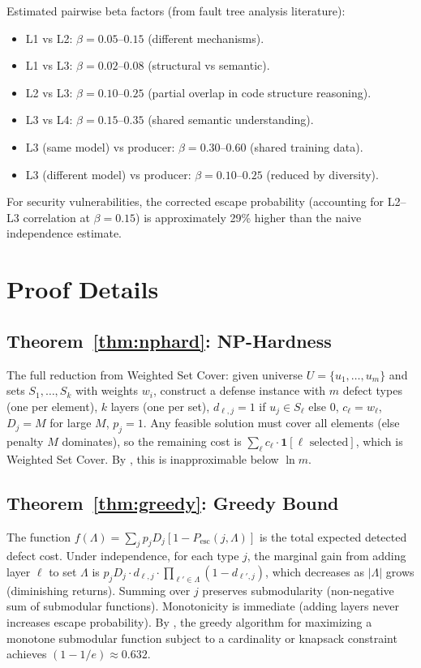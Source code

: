 \documentclass[11pt, a4paper, logo, copyright]{googledeepmind}
\newcommand{\Pesc}{P_{\mathrm{esc}}}
\begin{document}
\begin{appendices}
Estimated pairwise beta factors (from fault tree analysis literature):

\begin{itemize}
\item L1 vs L2: $\beta = 0.05$--$0.15$ (different mechanisms).
\item L1 vs L3: $\beta = 0.02$--$0.08$ (structural vs semantic).
\item L2 vs L3: $\beta = 0.10$--$0.25$ (partial overlap in code structure reasoning).
\item L3 vs L4: $\beta = 0.15$--$0.35$ (shared semantic understanding).
\item L3 (same model) vs producer: $\beta = 0.30$--$0.60$ (shared training data).
\item L3 (different model) vs producer: $\beta = 0.10$--$0.25$ (reduced by diversity).
\end{itemize}

For security vulnerabilities, the corrected escape probability (accounting for L2--L3 correlation at $\beta = 0.15$) is approximately 29\% higher than the naive independence estimate.

\section{Proof Details}
\label{app:proofs}

\subsection{Theorem~\ref{thm:nphard}: NP-Hardness}

The full reduction from Weighted Set Cover: given universe $U = \{u_1, \ldots, u_m\}$ and sets $S_1, \ldots, S_k$ with weights $w_i$, construct a defense instance with $m$ defect types (one per element), $k$ layers (one per set), $d_{\ell,j} = 1$ if $u_j \in S_\ell$ else $0$, $c_\ell = w_\ell$, $D_j = M$ for large $M$, $p_j = 1$. Any feasible solution must cover all elements (else penalty $M$ dominates), so the remaining cost is $\sum_\ell c_\ell \cdot \mathbf{1}[\ell \text{ selected}]$, which is Weighted Set Cover. By \citet{dinur2014}, this is inapproximable below $\ln m$.

\subsection{Theorem~\ref{thm:greedy}: Greedy Bound}

The function $f(\Lambda) = \sum_j p_j D_j [1 - \Pesc(j, \Lambda)]$ is the total expected detected defect cost. Under independence, for each type $j$, the marginal gain from adding layer $\ell$ to set $\Lambda$ is $p_j D_j \cdot d_{\ell,j} \cdot \prod_{\ell' \in \Lambda}(1-d_{\ell',j})$, which decreases as $|\Lambda|$ grows (diminishing returns). Summing over $j$ preserves submodularity (non-negative sum of submodular functions). Monotonicity is immediate (adding layers never increases escape probability). By \citet{nemhauser1978}, the greedy algorithm for maximizing a monotone submodular function subject to a cardinality or knapsack constraint achieves $(1-1/e) \approx 0.632$.

\end{appendices}
\end{document}
